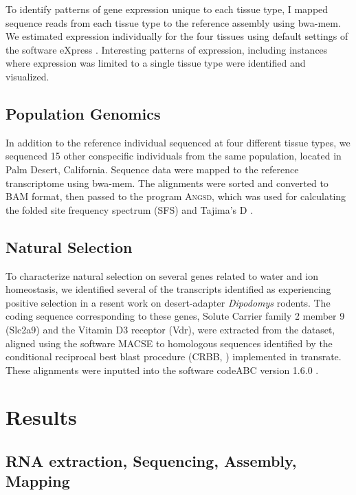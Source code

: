 \documentclass[11pt]{article}
\begin{document}
To identify patterns of gene expression unique to each tissue type, I mapped sequence reads from each tissue type to the reference assembly using bwa-mem. We estimated expression individually for the four tissues using default settings of the software eXpress \cite{Roberts:2012dh}. Interesting patterns of expression, including instances where expression was limited to a single tissue type were identified and visualized. \\ 

\subsection*{Population Genomics}

In addition to the reference individual sequenced at four different tissue types, we sequenced 15 other conspecific individuals from the same population, located in Palm Desert, California. Sequence data were mapped to the reference transcriptome using bwa-mem. The alignments were sorted and converted to BAM format, then passed to the program \textsc{Angsd}, which was used for calculating the folded site frequency spectrum (SFS) and Tajima's D \cite{Korneliussen:2013uz}. \\


\subsection*{Natural Selection}

To characterize natural selection on several genes related to water and ion homeostasis, we identified several of the transcripts identified as experiencing positive selection in a resent work on desert-adapter \textit{Dipodomys} rodents. The coding sequence corresponding to these genes, Solute Carrier family 2 member 9  (Slc2a9) and the Vitamin D3 receptor (Vdr), were extracted from the dataset, aligned using the software MACSE \cite{Ranwez:2011kj} to homologous sequences identified by the conditional reciprocal best blast procedure (CRBB, \cite{Aubry:2014en}) implemented in transrate. These alignments were inputted into the software codeABC version 1.6.0 \cite{Lopes:2013fd}.    


\section*{Results}

\subsection*{RNA extraction, Sequencing, Assembly, Mapping}
\end{document}
